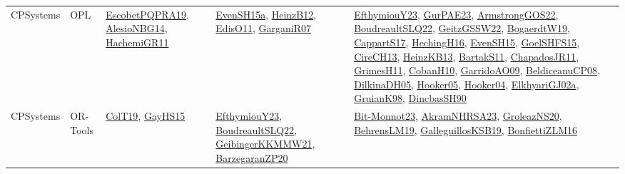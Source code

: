 {\begin{longtable}{lp{3cm}>{\raggedright}p{6cm}>{\raggedright}p{6cm}p{8cm}}
CPSystems & OPL & \href{articles/EscobetPQPRA19.pdf}{EscobetPQPRA19}\cite{EscobetPQPRA19}, \href{papers/AlesioNBG14.pdf}{AlesioNBG14}\cite{AlesioNBG14}, \href{articles/HachemiGR11.pdf}{HachemiGR11}\cite{HachemiGR11} & \href{articles/EvenSH15a.pdf}{EvenSH15a}\cite{EvenSH15a}, \href{papers/HeinzB12.pdf}{HeinzB12}\cite{HeinzB12}, \href{papers/EdisO11.pdf}{EdisO11}\cite{EdisO11}, \href{papers/GarganiR07.pdf}{GarganiR07}\cite{GarganiR07} & \href{papers/EfthymiouY23.pdf}{EfthymiouY23}\cite{EfthymiouY23}, \href{articles/GurPAE23.pdf}{GurPAE23}\cite{GurPAE23}, \href{papers/ArmstrongGOS22.pdf}{ArmstrongGOS22}\cite{ArmstrongGOS22}, \href{papers/BoudreaultSLQ22.pdf}{BoudreaultSLQ22}\cite{BoudreaultSLQ22}, \href{papers/GeitzGSSW22.pdf}{GeitzGSSW22}\cite{GeitzGSSW22}, \href{papers/BogaerdtW19.pdf}{BogaerdtW19}\cite{BogaerdtW19}, \href{papers/CappartS17.pdf}{CappartS17}\cite{CappartS17}, \href{papers/HechingH16.pdf}{HechingH16}\cite{HechingH16}, \href{papers/EvenSH15.pdf}{EvenSH15}\cite{EvenSH15}, \href{articles/GoelSHFS15.pdf}{GoelSHFS15}\cite{GoelSHFS15}, \href{papers/CireCH13.pdf}{CireCH13}\cite{CireCH13}, \href{papers/HeinzKB13.pdf}{HeinzKB13}\cite{HeinzKB13}, \href{articles/BartakS11.pdf}{BartakS11}\cite{BartakS11}, \href{papers/ChapadosJR11.pdf}{ChapadosJR11}\cite{ChapadosJR11}, \href{papers/GrimesH11.pdf}{GrimesH11}\cite{GrimesH11}, \href{papers/CobanH10.pdf}{CobanH10}\cite{CobanH10}, \href{articles/GarridoAO09.pdf}{GarridoAO09}\cite{GarridoAO09}, \href{papers/BeldiceanuCP08.pdf}{BeldiceanuCP08}\cite{BeldiceanuCP08}, \href{papers/DilkinaDH05.pdf}{DilkinaDH05}\cite{DilkinaDH05}, \href{articles/Hooker05.pdf}{Hooker05}\cite{Hooker05}, \href{papers/Hooker04.pdf}{Hooker04}\cite{Hooker04}, \href{papers/ElkhyariGJ02a.pdf}{ElkhyariGJ02a}\cite{ElkhyariGJ02a}, \href{papers/GruianK98.pdf}{GruianK98}\cite{GruianK98}, \href{articles/DincbasSH90.pdf}{DincbasSH90}\cite{DincbasSH90}\\
CPSystems & OR-Tools & \href{papers/ColT19.pdf}{ColT19}\cite{ColT19}, \href{papers/GayHS15.pdf}{GayHS15}\cite{GayHS15} & \href{papers/EfthymiouY23.pdf}{EfthymiouY23}\cite{EfthymiouY23}, \href{papers/BoudreaultSLQ22.pdf}{BoudreaultSLQ22}\cite{BoudreaultSLQ22}, \href{papers/GeibingerKKMMW21.pdf}{GeibingerKKMMW21}\cite{GeibingerKKMMW21}, \href{papers/BarzegaranZP20.pdf}{BarzegaranZP20}\cite{BarzegaranZP20} & \href{papers/Bit-Monnot23.pdf}{Bit-Monnot23}\cite{Bit-Monnot23}, \href{articles/AkramNHRSA23.pdf}{AkramNHRSA23}\cite{AkramNHRSA23}, \href{papers/GroleazNS20.pdf}{GroleazNS20}\cite{GroleazNS20}, \href{papers/BehrensLM19.pdf}{BehrensLM19}\cite{BehrensLM19}, \href{papers/GalleguillosKSB19.pdf}{GalleguillosKSB19}\cite{GalleguillosKSB19}, \href{papers/BonfiettiZLM16.pdf}{BonfiettiZLM16}\cite{BonfiettiZLM16}\\

\end{longtable}}
